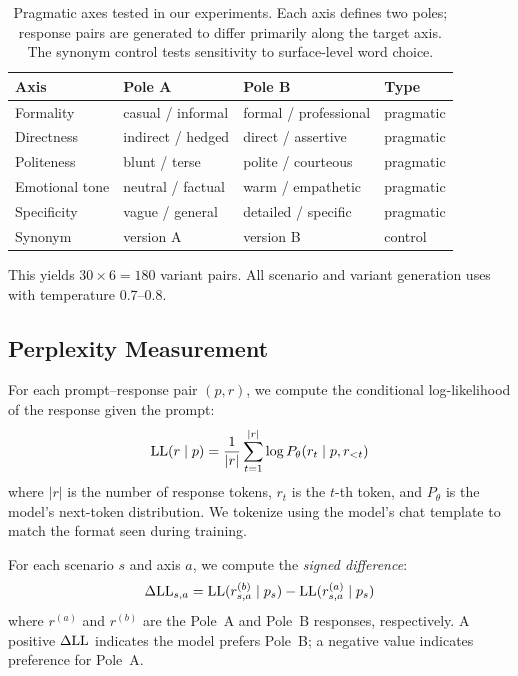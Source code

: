 \begin{table}[t]
    \centering
    \caption{Pragmatic axes tested in our experiments. Each axis defines two poles; response pairs are generated to differ primarily along the target axis. The synonym control tests sensitivity to surface-level word choice.}
    \begin{tabular}{@{}llll@{}}
        \toprule
        \textbf{Axis} & \textbf{Pole A} & \textbf{Pole B} & \textbf{Type} \\
        \midrule
        Formality & casual / informal & formal / professional & pragmatic \\
        Directness & indirect / hedged & direct / assertive & pragmatic \\
        Politeness & blunt / terse & polite / courteous & pragmatic \\
        Emotional tone & neutral / factual & warm / empathetic & pragmatic \\
        Specificity & vague / general & detailed / specific & pragmatic \\
        \midrule
        Synonym & version A & version B & control \\
        \bottomrule
    \end{tabular}
    \label{tab:axes}
\end{table}

This yields $30 \times 6 = 180$ variant pairs. All scenario and variant generation uses \gptfour with temperature 0.7--0.8.

\subsection{Perplexity Measurement}
\label{sec:perplexity}

For each prompt--response pair $(p, r)$, we compute the conditional log-likelihood of the response given the prompt:
\begin{equation}
    \mathrm{LL}(r \mid p) = \frac{1}{|r|} \sum_{t=1}^{|r|} \log P_\theta(r_t \mid p, r_{<t})
    \label{eq:loglik}
\end{equation}
where $|r|$ is the number of response tokens, $r_t$ is the $t$-th token, and $P_\theta$ is the model's next-token distribution. We tokenize using the model's chat template to match the format seen during training.

For each scenario $s$ and axis $a$, we compute the \emph{signed difference}:
\begin{equation}
    \Delta\mathrm{LL}_{s,a} = \mathrm{LL}(r^{(b)}_{s,a} \mid p_s) - \mathrm{LL}(r^{(a)}_{s,a} \mid p_s)
    \label{eq:delta}
\end{equation}
where $r^{(a)}$ and $r^{(b)}$ are the Pole~A and Pole~B responses, respectively. A positive $\Delta\mathrm{LL}$ indicates the model prefers Pole~B; a negative value indicates preference for Pole~A.

